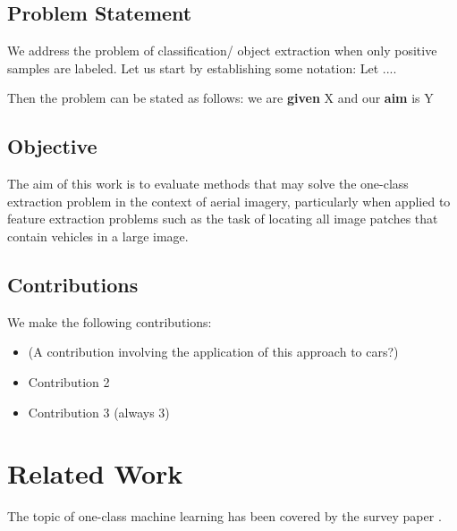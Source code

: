 \documentclass[12pt,letterpaper]{report}
\begin{document}
\section{Problem Statement}

We address the problem of classification/ object extraction when only positive samples are labeled. Let us start by establishing some notation: Let ....

Then the problem can be stated as follows: we are \textbf{given} X and our \textbf{aim} is Y

\section{Objective}

The aim of this work is to evaluate methods that may solve the one-class extraction problem in the context of aerial imagery, particularly when applied to feature extraction problems such as the task of locating all image patches that contain vehicles in a large image. 


\section{Contributions}

We make the following contributions: 
\begin{itemize}
    \item (A contribution involving the application of this approach to cars?)
    \item Contribution 2
    \item Contribution 3 (always 3)
\end{itemize}

\chapter{Related Work}


The topic of one-class machine learning has been covered by the survey paper \cite{Khan2010, Khan2014}. 



\end{document}
